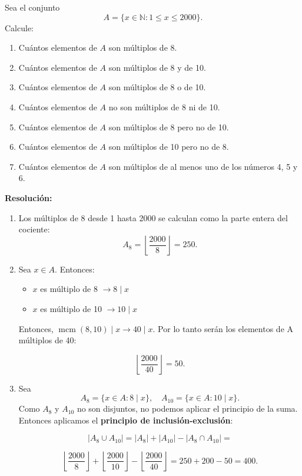 \documentclass[a4paper,12pt]{article}
\begin{document}
\begin{ejercicio}[title=Ejercicio 9]
Sea el conjunto 
\[
A = \{x \in \mathbb{N} : 1 \le x \le 2000\}.
\] 
Calcule:

\begin{enumerate}
\item[a)] Cuántos elementos de $A$ son múltiplos de 8.
\item[b)] Cuántos elementos de $A$ son múltiplos de 8 y de 10.
\item[c)] Cuántos elementos de $A$ son múltiplos de 8 o de 10.
\item[d)] Cuántos elementos de $A$ no son múltiplos de 8 ni de 10.
\item[e)] Cuántos elementos de $A$ son múltiplos de 8 pero no de 10.
\item[f)] Cuántos elementos de $A$ son múltiplos de 10 pero no de 8.
\item[g)] Cuántos elementos de $A$ son múltiplos de al menos uno de los números 4, 5 y 6.
\end{enumerate}

\tcblower
\textbf{Resolución:}

\begin{enumerate}
\item[a)] 
Los múltiplos de 8 desde 1 hasta 2000 se calculan como la parte entera del cociente:
\[
A_8 = \left\lfloor \frac{2000}{8} \right\rfloor = \boxed{250}.
\]

\item[b)] Sea $x \in A$. Entonces:
\begin{itemize}
    \item $x$ es múltiplo de 8 $\rightarrow 8 \mid x$
    \item $x$ es múltiplo de 10 $\rightarrow 10 \mid x$
\end{itemize}
Entonces, $\operatorname{mcm}(8,10) \mid x \rightarrow 40 \mid x$. Por lo tanto serán los elementos de A múltiplos de 40:

\[
\left\lfloor \frac{2000}{40} \right\rfloor = \boxed{50}.
\]

\item[c)]
Sea 
\[
A_8 = \{x \in A : 8 \mid x\}, \quad A_{10} = \{x \in A : 10 \mid x\}.
\]  
Como $A_8$ y $A_{10}$ no son disjuntos, no podemos aplicar el principio de la suma. Entonces aplicamos el \textbf{principio de inclusión-exclusión}:

\[
|A_8 \cup A_{10}| = |A_8| + |A_{10}| - |A_8 \cap A_{10}| =
\]

\[
\left\lfloor \frac{2000}{8} \right\rfloor + \left\lfloor \frac{2000}{10} \right\rfloor - \left\lfloor \frac{2000}{40} \right\rfloor = 250 + 200 - 50 = \boxed{400}.
\]

\end{enumerate}

\end{ejercicio}
\end{document}
